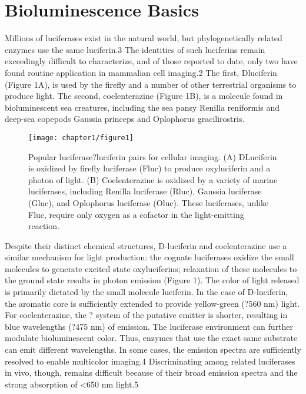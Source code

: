 \section{Bioluminescence Basics}
Millions of luciferases exist in the natural world, but
phylogenetically related enzymes use the same luciferin.3 The
identities of such luciferins remain exceedingly difficult to
characterize, and of those reported to date, only two have found
routine application in mammalian cell imaging.2 The first, Dluciferin
(Figure 1A), is used by the firefly and a number of
other terrestrial organisms to produce light. The second,
coelenterazine (Figure 1B), is a molecule found in bioluminescent
sea creatures, including the sea pansy Renilla
reniformis and deep-sea copepods Gaussia princeps and
Oplophorus gracilirostris. 

\begin{figure}
\texttt{[image: chapter1/figure1]}
\caption{Popular luciferase?luciferin pairs for cellular imaging. (A) DLuciferin
is oxidized by firefly luciferase (Fluc) to produce oxyluciferin
and a photon of light. (B) Coelenterazine is oxidized by a variety of
marine luciferases, including Renilla luciferase (Rluc), Gaussia
luciferase (Gluc), and Oplophorus luciferase (Oluc). These luciferases,
unlike Fluc, require only oxygen as a cofactor in the light-emitting
reaction.}
  \label{fig:luc_oxidation}
\end{figure}

Despite their distinct chemical
structures, D-luciferin and coelenterazine use a similar
mechanism for light production: the cognate luciferases oxidize
the small molecules to generate excited state oxyluciferins;
relaxation of these molecules to the ground state results in
photon emission (Figure 1).
The color of light released is primarily dictated by the small
molecule luciferin. In the case of D-luciferin, the aromatic core
is sufficiently extended to provide yellow-green (?560 nm)
light. For coelenterazine, the ? system of the putative emitter is
shorter, resulting in blue wavelengths (?475 nm) of emission.
The luciferase environment can further modulate bioluminescent
color. Thus, enzymes that use the exact same substrate can
emit different wavelengths. In some cases, the emission spectra
are sufficiently resolved to enable multicolor imaging.4
Discriminating among related luciferases in vivo, though,
remains difficult because of their broad emission spectra and
the strong absorption of <650 nm light.5
